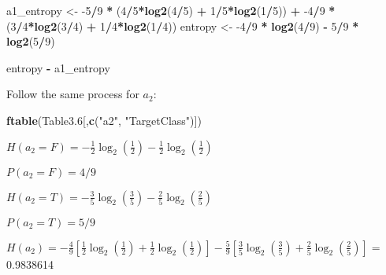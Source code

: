 \documentclass[]{article}
\newenvironment{Shaded}{\begin{snugshade}}{\end{snugshade}}
\newcommand{\DecValTok}[1]{\textcolor[rgb]{0.00,0.00,0.81}{#1}}
\newcommand{\FloatTok}[1]{\textcolor[rgb]{0.00,0.00,0.81}{#1}}
\newcommand{\KeywordTok}[1]{\textcolor[rgb]{0.13,0.29,0.53}{\textbf{#1}}}
\newcommand{\NormalTok}[1]{#1}
\newcommand{\OperatorTok}[1]{\textcolor[rgb]{0.81,0.36,0.00}{\textbf{#1}}}
\newcommand{\StringTok}[1]{\textcolor[rgb]{0.31,0.60,0.02}{#1}}
\begin{document}
\begin{Shaded}
\begin{Highlighting}[]
\NormalTok{a1_entropy <-}\StringTok{ }\DecValTok{-5}\OperatorTok{/}\DecValTok{9} \OperatorTok{*}\StringTok{ }\NormalTok{(}\DecValTok{4}\OperatorTok{/}\DecValTok{5}\OperatorTok{*}\KeywordTok{log2}\NormalTok{(}\DecValTok{4}\OperatorTok{/}\DecValTok{5}\NormalTok{) }\OperatorTok{+}\StringTok{ }\DecValTok{1}\OperatorTok{/}\DecValTok{5}\OperatorTok{*}\KeywordTok{log2}\NormalTok{(}\DecValTok{1}\OperatorTok{/}\DecValTok{5}\NormalTok{)) }\OperatorTok{+}\StringTok{ }\DecValTok{-4}\OperatorTok{/}\DecValTok{9} \OperatorTok{*}\StringTok{ }\NormalTok{(}\DecValTok{3}\OperatorTok{/}\DecValTok{4}\OperatorTok{*}\KeywordTok{log2}\NormalTok{(}\DecValTok{3}\OperatorTok{/}\DecValTok{4}\NormalTok{) }\OperatorTok{+}\StringTok{ }\DecValTok{1}\OperatorTok{/}\DecValTok{4}\OperatorTok{*}\KeywordTok{log2}\NormalTok{(}\DecValTok{1}\OperatorTok{/}\DecValTok{4}\NormalTok{))}
\NormalTok{entropy <-}\StringTok{ }\DecValTok{-4}\OperatorTok{/}\DecValTok{9} \OperatorTok{*}\StringTok{ }\KeywordTok{log2}\NormalTok{(}\DecValTok{4}\OperatorTok{/}\DecValTok{9}\NormalTok{) }\OperatorTok{-}\StringTok{ }\DecValTok{5}\OperatorTok{/}\DecValTok{9} \OperatorTok{*}\StringTok{ }\KeywordTok{log2}\NormalTok{(}\DecValTok{5}\OperatorTok{/}\DecValTok{9}\NormalTok{)}

\NormalTok{entropy }\OperatorTok{-}\StringTok{ }\NormalTok{a1_entropy}
\end{Highlighting}
\end{Shaded}

Follow the same process for \(a_2\):

\begin{Shaded}
\begin{Highlighting}[]
\KeywordTok{ftable}\NormalTok{(Table3}\FloatTok{.6}\NormalTok{[,}\KeywordTok{c}\NormalTok{(}\StringTok{"a2"}\NormalTok{, }\StringTok{"TargetClass"}\NormalTok{)])}
\end{Highlighting}
\end{Shaded}

\(H(a_2 = F) = -\frac{1}{2}\log_2\left(\frac{1}{2}\right)-\frac{1}{2}\log_2\left(\frac{1}{2}\right)\)

\(P(a_2 = F) = 4/9\)

\(H(a_2 = T) = -\frac{3}{5}\log_2\left(\frac{3}{5}\right) - \frac{2}{5}\log_2\left(\frac{2}{5}\right)\)

\(P(a_2 = T) = 5/9\)

\(H(a_2) = -\frac{4}{9}\left[\frac{1}{2}\log_2\left(\frac{1}{2}\right)+\frac{1}{2}\log_2\left(\frac{1}{2}\right)\right] -\frac{5}{9}\left[\frac{3}{5}\log_2\left(\frac{3}{5}\right) + \frac{2}{5}\log_2\left(\frac{2}{5}\right)\right] =\)
0.9838614
\end{document}
